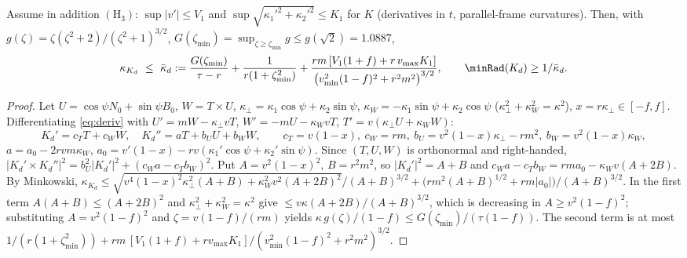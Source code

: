 \begin{proposition}[curvature of $K_d$]\label{prop:Hccurv}
Assume in addition $(\mathrm H_3)$: $\sup|v'|\le V_1$ and $\sup\sqrt{\kappa_1'^2+\kappa_2'^2}\le K_1$ for $K$
(derivatives in $t$, parallel-frame curvatures). Then, with $g(\zeta)=\zeta(\zeta^2+2)/(\zeta^2+1)^{3/2}$,
$G(\zeta_{\min})=\sup_{\zeta\ge\zeta_{\min}}g\le g(\sqrt2)=1.0887$,
\begin{equation}\label{eq:Hckappa}
\kappa_{K_d}\ \le\ \bar\kappa_d:=\frac{G(\zeta_{\min})}{\tau-r}+\frac1{r(1+\zeta_{\min}^2)}
+\frac{rm\,[V_1(1+f)+r\,v_{\max}K_1]}{\bigl(v_{\min}^2(1-f)^2+r^2m^2\bigr)^{3/2}},
\qquad \minRad(K_d)\ge1/\bar\kappa_d .
\end{equation}
\end{proposition}
\begin{proof}
Let $U=\cos\psi N_0+\sin\psi B_0$, $W=T\times U$, $\kappa_\perp=\kappa_1\cos\psi+\kappa_2\sin\psi$,
$\kappa_W=-\kappa_1\sin\psi+\kappa_2\cos\psi$ ($\kappa_\perp^2+\kappa_W^2=\kappa^2$), $x=r\kappa_\perp\in[-f,f]$.
Differentiating \eqref{eq:deriv} with $U'=mW-\kappa_\perp vT$, $W'=-mU-\kappa_WvT$, $T'=v(\kappa_\perp U+\kappa_WW)$:
\[
K_d'=c_TT+c_WW,\quad K_d''=aT+b_UU+b_WW,\qquad
c_T=v(1-x),\ c_W=rm,\ b_U=v^2(1-x)\kappa_\perp-rm^2,\ b_W=v^2(1-x)\kappa_W,
\]
$a=a_0-2rvm\kappa_W$, $a_0=v'(1-x)-rv(\kappa_1'\cos\psi+\kappa_2'\sin\psi)$. Since $(T,U,W)$ is orthonormal and
right-handed, $|K_d'\times K_d''|^2=b_U^2|K_d'|^2+(c_Wa-c_Tb_W)^2$. Put $A=v^2(1-x)^2$, $B=r^2m^2$, so
$|K_d'|^2=A+B$ and $c_Wa-c_Tb_W=rma_0-\kappa_Wv(A+2B)$. By Minkowski,
$\kappa_{K_d}\le\sqrt{v^4(1-x)^2\kappa_\perp^2(A+B)+\kappa_W^2v^2(A+2B)^2}/(A+B)^{3/2}
+\bigl(rm^2(A+B)^{1/2}+rm|a_0|\bigr)/(A+B)^{3/2}$. In the first term
$A(A+B)\le(A+2B)^2$ and $\kappa_\perp^2+\kappa_W^2=\kappa^2$ give $\le v\kappa(A+2B)/(A+B)^{3/2}$, which is
decreasing in $A\ge v^2(1-f)^2$; substituting $A=v^2(1-f)^2$ and $\zeta=v(1-f)/(rm)$ yields
$\kappa\,g(\zeta)/(1-f)\le G(\zeta_{\min})/(\tau(1-f))$. The second term is at most
$1/(r(1+\zeta_{\min}^2))+rm\,[V_1(1+f)+rv_{\max}K_1]/(v_{\min}^2(1-f)^2+r^2m^2)^{3/2}$.
\end{proof}

